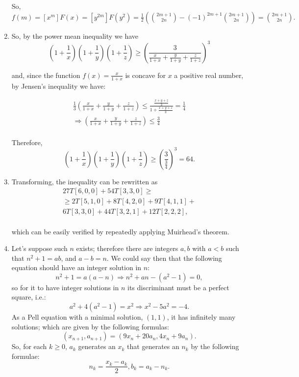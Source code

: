 \documentclass{article}
\begin{document}
\begin{enumerate}
So,
$
	f(m) = [x^{m}]F(x) = [y^{2m}]F(y^2)
	= \frac{1}{2}\left( \binom{2m + 1}{2n} - (-1)^{2m + 1}\binom{2m + 1}{2n} \right)
	= \binom{2m + 1}{2n}.
$

\item So, by the power mean inequality we have
$$
	\left(1 + \frac{1}{x}\right)\left(1 + \frac{1}{y}\right)\left(1 + \frac{1}{z}\right)
	\geq \left(\frac{3}{\frac{x}{1 + x} + \frac{y}{1 + y} + \frac{z}{1 + z}}\right)^{3}
$$

and, since the function $f(x) = \frac{x}{1 + x}$ is concave for $x$ a positive
real number, by Jensen's inequality we have:

\begin{eqnarray*}
\frac{1}{3}\left(\frac{x}{1 + x} + \frac{y}{1 + y} + \frac{z}{1 + z}\right) \leq \frac{\frac{x + y + z}{3}}{1 + \frac{x + y + z}{3}} = \frac{1}{4} \\
\Rightarrow \left(\frac{x}{1 + x} + \frac{y}{1 + y} + \frac{z}{1 + z}\right) \leq \frac{3}{4} \\
\end{eqnarray*}

Therefore,
$$
	\left(1 + \frac{1}{x}\right)\left(1 + \frac{1}{y}\right)\left(1 + \frac{1}{z}\right) \geq
	\left(\frac{3}{\frac{3}{4}}\right)^{3} = 64.
$$

\item Transforming, the inequality can be rewritten as
\begin{eqnarray*}
27T[6, 0, 0] + 54T[3, 3, 0] \geq \\
\geq 2T[5, 1, 0] + 8T[4, 2, 0] + 9T[4, 1, 1] + \\
6T[3, 3, 0] + 44T[3, 2, 1] + 12T[2, 2, 2], \\
\end{eqnarray*}

which can be easily verified by repeatedly applying Muirhead's theorem.

\item
Let's suppose such $n$ exists; therefore there are integers
$a, b$ with $a < b$ such that $n^2 + 1 = ab$, and
$a - b = n$. We could say then that the following
equation should have an integer solution in $n$:
$$
	n^2 + 1 = a(a - n) \Rightarrow n^2 +an - (a^2 - 1) = 0,
$$
so for it to have integer solutions in $n$ its discriminant
must be a perfect square, i.e.:
$$
	a^2 + 4(a^2 - 1) = x^2 \Rightarrow x^2 - 5a^2 = -4.
$$
As a Pell equation with a minimal solution, $(1, 1)$, it
has infinitely many solutions; which are given by the
following formulas:
$$
	(x_{n + 1}, a_{n + 1}) = (9x_n + 20a_n, 4x_n + 9a_n).
$$	
So, for each $k \geq 0$, $a_k$ generates an $x_k$ that
generates an $n_k$ by the following formulae:
$$
	n_k = \frac{x_k - a_k}{2}, b_k = a_k - n_k.
$$


\end{enumerate}
\end{document}
